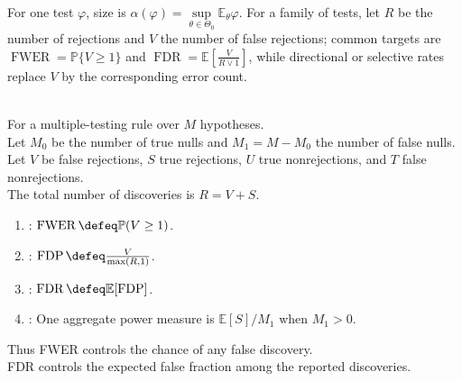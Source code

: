 \begin{remark} \label{rem:error-control-families} \\
For one test $\varphi$, size is $\alpha(\varphi)=\sup\limits_{\theta\in\Theta_0}\mathbb{E}_\theta\varphi$.
For a family of tests, let $R$ be the number of rejections and $V$ the number of false rejections; common targets are $\operatorname{FWER}=\mathbb{P}\{V\geq1\}$ and $\operatorname{FDR}=\mathbb{E}[\frac{V}{R\vee1}]$, while directional or selective rates replace $V$ by the corresponding error count.
\end{remark}

\begin{definition} \label{def:false-discovery-rate} \\
For a multiple-testing rule over $M$ hypotheses.\\
Let $M_0$ be the number of true nulls and $M_1=M-M_0$ the number of false nulls.\\
Let $V$ be false rejections, $S$ true rejections, $U$ true nonrejections, and $T$ false nonrejections.\\
The total number of discoveries is $R=V+S$.
\begin{enumerate}[label=(\roman*)]
\setlength{\itemsep}{0pt}
\item {}: $\operatorname{FWER}\defeq\mathbb{P}(V\geq1)$.
\item {}: $\operatorname{FDP}\defeq\frac{V}{\max(R,1)}$.
\item {}: $\operatorname{FDR}\defeq\mathbb{E}[\operatorname{FDP}]$.
\item {}: One aggregate power measure is $\mathbb{E}[S]/M_1$ when $M_1>0$.
\end{enumerate}
Thus FWER controls the chance of any false discovery.\\
FDR controls the expected false fraction among the reported discoveries.
\end{definition}

